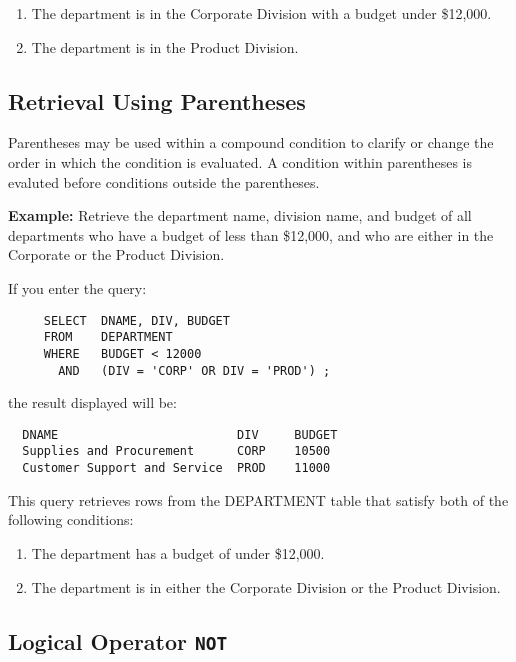 \begin{enumerate}
\item The department is in the Corporate Division with a budget under
\$12,000.

\item The department is in the Product Division.
\end{enumerate}

\subsection{Retrieval Using Parentheses}

Parentheses may be used within a compound condition to clarify or
change the order in which the condition is evaluated.  A condition
within parentheses is evaluted before conditions outside the
parentheses.

{\bf Example:}
Retrieve the department name, division name, and budget of all
departments who have a budget of less than \$12,000, and who are
either in the Corporate or the Product Division.

If you enter the query:
\begin{verbatim}
     SELECT  DNAME, DIV, BUDGET
     FROM    DEPARTMENT
     WHERE   BUDGET < 12000
       AND   (DIV = 'CORP' OR DIV = 'PROD') ;
\end{verbatim}
the result displayed will be:

\begin{screen}
\begin{verbatim}
  DNAME                         DIV     BUDGET
  Supplies and Procurement      CORP    10500
  Customer Support and Service  PROD    11000
\end{verbatim}
\end{screen}

This query retrieves rows from the DEPARTMENT table that satisfy both
of the following conditions:

\begin{enumerate}
\item The department has a budget of under \$12,000.

\item The department is in either the Corporate Division or the
Product Division.
\end{enumerate}

\subsection{Logical Operator {\tt NOT}}

